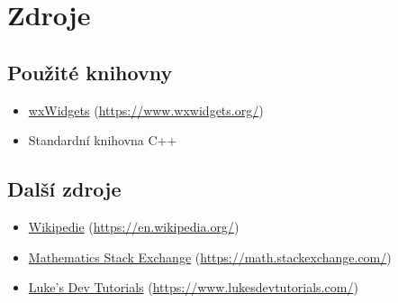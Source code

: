 \documentclass[11pt]{article}
\newcommand{\odkaz}[2]{
    \href{#1}{#2} (\href{#1}{#1})
}
\begin{document}
    \section{Zdroje}

    \subsection{Použité knihovny}
    \begin{itemize}
        \itemsep0em
        \item \odkaz{https://www.wxwidgets.org/}{wxWidgets}
        \item Standardní knihovna C++
    \end{itemize}
    \subsection{Další zdroje}
    \begin{itemize}
        \itemsep0em
        \item \odkaz{https://en.wikipedia.org/}{Wikipedie}
        \item \odkaz{https://math.stackexchange.com/}{Mathematics Stack Exchange}
        \item \odkaz{https://www.lukesdevtutorials.com/}{Luke's Dev Tutorials}
    \end{itemize}
\end{document}

